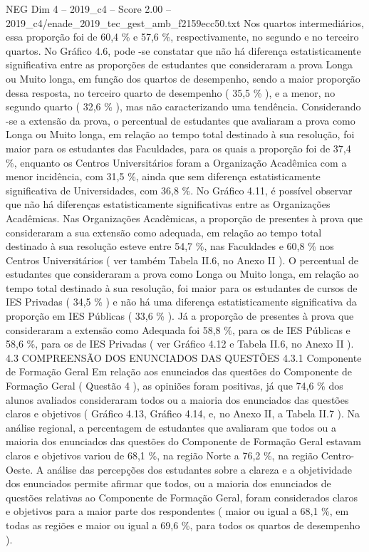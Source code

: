 \begin{textsample}{NEG Dim 4 – 2019\_c4 – Score 2.00 – 2019\_c4/enade\_2019\_tec\_gest\_amb\_f2159ecc50.txt}
Nos quartos intermediários, essa proporção foi de 60,4 \% e 57,6 \%, respectivamente, no segundo e no terceiro quartos.
No Gráfico 4.6, pode -se constatar que não há diferença estatisticamente significativa entre as proporções de estudantes que consideraram a prova Longa ou Muito longa, em função dos quartos de desempenho, sendo a maior proporção dessa resposta, no terceiro quarto de desempenho ( 35,5 \% ), e a menor, no segundo quarto ( 32,6 \% ), mas não caracterizando uma tendência.
Considerando -se a extensão da prova, o percentual de estudantes que avaliaram a prova como Longa ou Muito longa, em relação ao tempo total destinado à sua resolução, foi maior para os estudantes das Faculdades, para os quais a proporção foi de 37,4 \%, enquanto os Centros Universitários foram a Organização Acadêmica com a menor incidência, com 31,5 \%, ainda que sem diferença estatisticamente significativa de Universidades, com 36,8 \%.
No Gráfico 4.11, é possível observar que não há diferenças estatisticamente significativas entre as Organizações Acadêmicas.
Nas Organizações Acadêmicas, a proporção de presentes à prova que consideraram a sua extensão como adequada, em relação ao tempo total destinado à sua resolução esteve entre 54,7 \%, nas Faculdades e 60,8 \% nos Centros Universitários ( ver também Tabela II.6, no Anexo II ).
O percentual de estudantes que consideraram a prova como Longa ou Muito longa, em relação ao tempo total destinado à sua resolução, foi maior para os estudantes de cursos de IES Privadas ( 34,5 \% ) e não há uma diferença estatisticamente significativa da proporção em IES Públicas ( 33,6 \% ).
Já a proporção de presentes à prova que consideraram a extensão como Adequada foi 58,8 \%, para os de IES Públicas e 58,6 \%, para os de IES Privadas ( ver Gráfico 4.12 e Tabela II.6, no Anexo II ). 4.3 COMPREENSÃO DOS ENUNCIADOS DAS QUESTÕES 4.3.1 Componente de Formação Geral Em relação aos enunciados das questões do Componente de Formação Geral ( Questão 4 ), as opiniões foram positivas, já que 74,6 \% dos alunos avaliados consideraram todos ou a maioria dos enunciados das questões claros e objetivos ( Gráfico 4.13, Gráfico 4.14, e, no Anexo II, a Tabela II.7 ).
Na análise regional, a percentagem de estudantes que avaliaram que todos ou a maioria dos enunciados das questões do Componente de Formação Geral estavam claros e objetivos variou de 68,1 \%, na região Norte a 76,2 \%, na região Centro-Oeste.
A análise das percepções dos estudantes sobre a clareza e a objetividade dos enunciados permite afirmar que todos, ou a maioria dos enunciados de questões relativas ao Componente de Formação Geral, foram considerados claros e objetivos para a maior parte dos respondentes ( maior ou igual a 68,1 \%, em todas as regiões e maior ou igual a 69,6 \%, para todos os quartos de desempenho ).

\end{textsample}

